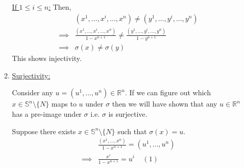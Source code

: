 \documentclass{article}
\newcommand{\R}{\mathbb{R}}
\begin{document}
\begin{enumerate}[label=(\alph*)]
\begin{enumerate}[label=(\arabic*),ref=\arabic*]
    \vskip 0.25cm
    \underline{If $1 \leq i \leq n$:} Then, 
    \begin{align*}
      &(x^1, \dots, x^i, \dots, x^n) \neq (y^1, \dots, y^i, \dots, y^n) \\
      \implies& \frac{(x^1, \dots, x^i, \dots, x^n)}{1 - x^{n+1}} \neq \frac{(y^1, \dots, y^i, \dots, y^n)}{1 - y^{n+1}} \\
      \implies& \sigma(x) \neq \sigma(y)
    \end{align*}
    This shows injectivity.

    \vskip 0.5cm
    \item \underline{Surjectivity:}
    
    Consider any $u = (u^1, \dots, u^n) \in \R^{n}$. If we can figure out which $x \in \mathbb{S}^n \setminus \{N\}$ maps to $u$ under $\sigma$ then we will have shown that any $u \in \R^{n}$ has a pre-image under $\sigma$ i.e. $\sigma$ is surjective.

    \vskip 0.5cm
    Suppose there exists $x \in \mathbb{S}^n \setminus \{N\}$ such that $\sigma(x) = u$.
    \begin{align*}
      &\frac{(x^1, \dots, x^{n})}{1 - x^{n+1}} = (u^1, \dots, u^n) \\
      \implies & \boxed{ \frac{x^i}{1 - x^{n+1}} = u^i} \;\;\;\;(1)
    \end{align*}


\end{enumerate}
\end{enumerate}
\end{document}
